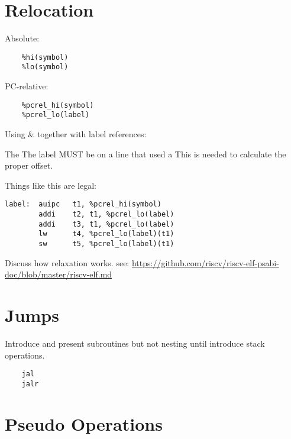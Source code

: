\section{Relocation}

Absolute:
\begin{verbatim}
    %hi(symbol)         
    %lo(symbol)         
\end{verbatim}

PC-relative:
\begin{verbatim}
    %pcrel_hi(symbol)   
    %pcrel_lo(label)    
\end{verbatim}

Using \verb@auipc@ \& \verb@addi@ together with label references:

The \verb@%pcrel_lo()@ uses the label to find the associated \verb@%pcrel_hi()@.
The label MUST be on a line that used a \verb@%pcrel_hi()@ or get an error.
This is needed to calculate the proper offset.

Things like this are legal:
\begin{verbatim}
label:  auipc   t1, %pcrel_hi(symbol)
        addi    t2, t1, %pcrel_lo(label)
        addi    t3, t1, %pcrel_lo(label)
        lw      t4, %pcrel_lo(label)(t1)
        sw      t5, %pcrel_lo(label)(t1)
\end{verbatim}

Discuss how relaxation works.
see:  \url{https://github.com/riscv/riscv-elf-psabi-doc/blob/master/riscv-elf.md}


\section{Jumps}

Introduce and present subroutines but not nesting until introduce stack operations.

\label{uguide:jal}
\label{uguide:jalr}
\begin{verbatim}
    jal
    jalr
\end{verbatim}



\section{Pseudo Operations}

